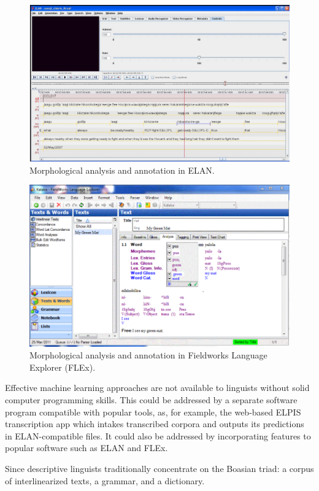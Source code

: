 \documentclass[12pt]{article}
\begin{document}
\begin{figure}[ht]
\label{fig:ELAN}
\begin{center}
\includegraphics[width=0.75\columnwidth]{ELAN.PNG}
\caption{Morphological analysis and annotation in ELAN.}
\end{center}
\end{figure}

\begin{figure}[ht]
\label{fig:FLEX}
\begin{center}
\includegraphics[width=0.75\columnwidth]{FLEX.PNG}
\caption{Morphological analysis and annotation in Fieldworks Language Explorer (FLEx).}
\end{center}
\end{figure}

Effective machine learning approaches are not available to linguists without solid computer programming skills. This could be addressed by a separate software program compatible with popular tools, as, for example, the web-based ELPIS \cite{foley_elpis_2018} transcription app which intakes transcribed corpora and outputs its predictions in ELAN-compatible files. It could also be addressed by incorporating features to popular software such as ELAN and FLEx. 



Since descriptive linguists traditionally concentrate on the Boasian triad: a corpus of interlinearized texts, a grammar, and a dictionary.
\end{document}
